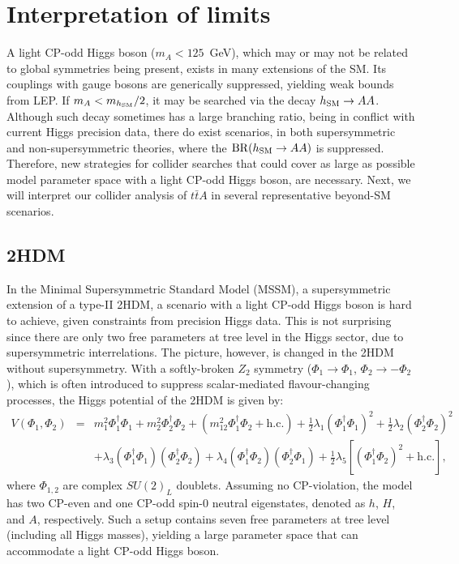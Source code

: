 \documentclass[preprintnumbers,superscriptaddress,nofootinbib,aps,prd,floatfix]{revtex4}
\newcommand{\BR} {\ensuremath{\mathrm{BR}}}
\begin{document}
\section{Interpretation of limits}
\label{sec:interpretation}

A light CP-odd Higgs boson ($m_A < 125$~GeV), which may or may not be related to global symmetries being present, exists in many extensions of the SM. Its couplings with gauge bosons are generically suppressed, yielding weak bounds from LEP. If $m_A<m_{h_{\rm SM}}/2$, it may be searched via the 
decay $h_{\rm SM} \to AA$. Although such decay sometimes has a large branching ratio, being in conflict with current Higgs precision data, there do exist scenarios, in both supersymmetric and non-supersymmetric theories, where the $\BR(h_{\rm SM}\to AA)$ is suppressed. 
Therefore, new strategies for collider searches that could cover as large as possible model parameter space with a light CP-odd Higgs boson, are necessary. 
Next, we will interpret our collider analysis of $t\bar t A$ in several representative beyond-SM scenarios. 

\subsection{2HDM}

In the Minimal Supersymmetric Standard Model (MSSM), a supersymmetric extension of a type-II 2HDM, a scenario with a light CP-odd Higgs boson is hard to achieve, given constraints from precision Higgs data. This is not surprising since there are only two free parameters at tree level in the Higgs sector, due to supersymmetric interrelations. The picture, however, is changed in the 2HDM without supersymmetry. With a softly-broken $Z_2$ symmetry ($\Phi_1 \to \Phi_1$, $\Phi_2 \to -\Phi_2$), which is often introduced to suppress scalar-mediated flavour-changing processes, the Higgs potential of the 2HDM is given by: 
\begin{eqnarray} 
V(\Phi_1,\Phi_2) &=& m^2_1 \Phi^{\dagger}_1\Phi_1+m^2_2
\Phi^{\dagger}_2\Phi_2 + (m^2_{12} \Phi^{\dagger}_1\Phi_2+{\mathrm{h.c.}
}) +\frac{1}{2} \lambda_1 (\Phi^{\dagger}_1\Phi_1)^2 +\frac{1}{2}
\lambda_2 (\Phi^{\dagger}_2\Phi_2)^2\nonumber \\ 
&& +\lambda_3
(\Phi^{\dagger}_1\Phi_1)(\Phi^{\dagger}_2\Phi_2) + \lambda_4
(\Phi^{\dagger}_1\Phi_2)(\Phi^{\dagger}_2\Phi_1) + \frac{1}{2}
\lambda_5[(\Phi^{\dagger}_1\Phi_2)^2+{\mathrm{h.c.}}],
\end{eqnarray}
where $\Phi_{1,2}$ are complex $SU(2)_L$ doublets. Assuming no CP-violation, the model has two CP-even and one CP-odd spin-0 neutral eigenstates, denoted as $h$, $H$, and $A$, respectively. Such a setup contains seven free parameters at tree level (including all Higgs masses), yielding a large parameter space that can accommodate a light CP-odd Higgs boson. 
\end{document}
